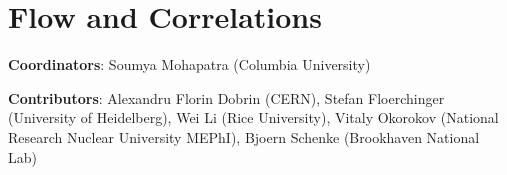 \documentclass[../report.tex]{subfiles}
\providecommand{\main}{..}
\begin{document}
\section{Flow and Correlations}
\label{sec:flow}

\noindent \textbf{Coordinators}: Soumya Mohapatra (Columbia University)


\noindent \textbf{Contributors}: Alexandru Florin Dobrin (CERN), Stefan Floerchinger (University of Heidelberg), Wei Li (Rice University), Vitaly Okorokov (National Research Nuclear University MEPhI), Bjoern Schenke (Brookhaven National Lab)

\FloatBarrier

\FloatBarrier
\FloatBarrier
\FloatBarrier
\FloatBarrier
\FloatBarrier
\FloatBarrier
\end{document}
